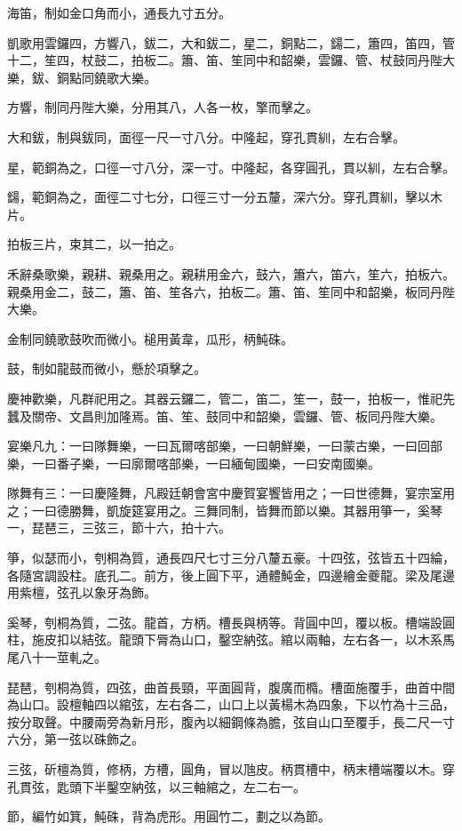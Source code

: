 \begin{pinyinscope}
海笛，制如金口角而小，通長九寸五分。

凱歌用雲鑼四，方響八，鈸二，大和鈸二，星二，銅點二，鐋二，簫四，笛四，管十二，笙四，杖鼓二，拍板二。簫、笛、笙同中和韶樂，雲鑼、管、杖鼓同丹陛大樂，鈸、銅點同鐃歌大樂。

方響，制同丹陛大樂，分用其八，人各一枚，擎而擊之。

大和鈸，制與鈸同，面徑一尺一寸八分。中隆起，穿孔貫紃，左右合擊。

星，範銅為之，口徑一寸八分，深一寸。中隆起，各穿圓孔，貫以紃，左右合擊。

鐋，範銅為之，面徑二寸七分，口徑三寸一分五釐，深六分。穿孔貫紃，擊以木片。

拍板三片，束其二，以一拍之。

禾辭桑歌樂，親耕、親桑用之。親耕用金六，鼓六，簫六，笛六，笙六，拍板六。親桑用金二，鼓二，簫、笛、笙各六，拍板二。簫、笛、笙同中和韶樂，板同丹陛大樂。

金制同鐃歌鼓吹而微小。槌用黃韋，瓜形，柄魨硃。

鼓，制如龍鼓而微小，懸於項擊之。

慶神歡樂，凡群祀用之。其器云鑼二，管二，笛二，笙一，鼓一，拍板一，惟祀先蠶及關帝、文昌則加隆焉。笛、笙、鼓同中和韶樂，雲鑼、管、板同丹陛大樂。

宴樂凡九：一曰隊舞樂，一曰瓦爾喀部樂，一曰朝鮮樂，一曰蒙古樂，一曰回部樂，一曰番子樂，一曰廓爾喀部樂，一曰緬甸國樂，一曰安南國樂。

隊舞有三：一曰慶隆舞，凡殿廷朝會宮中慶賀宴饗皆用之；一曰世德舞，宴宗室用之；一曰德勝舞，凱旋筵宴用之。三舞同制，皆舞而節以樂。其器用箏一，奚琴一，琵琶三，三弦三，節十六，拍十六。

箏，似瑟而小，刳桐為質，通長四尺七寸三分八釐五豪。十四弦，弦皆五十四綸，各隨宮調設柱。底孔二。前方，後上圓下平，通體魨金，四邊繪金夔龍。梁及尾邊用紫檀，弦孔以象牙為飾。

奚琴，刳桐為質，二弦。龍首，方柄。槽長與柄等。背圓中凹，覆以板。槽端設圓柱，施皮扣以結弦。龍頭下脣為山口，鑿空納弦。綰以兩軸，左右各一，以木系馬尾八十一莖軋之。

琵琶，刳桐為質，四弦，曲首長頸，平面圓背，腹廣而橢。槽面施覆手，曲首中間為山口。設檀軸四以綰弦，左右各二，山口上以黃楊木為四象，下以竹為十三品，按分取聲。中腰兩旁為新月形，腹內以細鋼條為膽，弦自山口至覆手，長二尺一寸六分，第一弦以硃飾之。

三弦，斫檀為質，修柄，方槽，圓角，冒以虺皮。柄貫槽中，柄末槽端覆以木。穿孔貫弦，匙頭下半鑿空納弦，以三軸綰之，左二右一。

節，編竹如箕，魨硃，背為虎形。用圓竹二，劃之以為節。


\end{pinyinscope}
